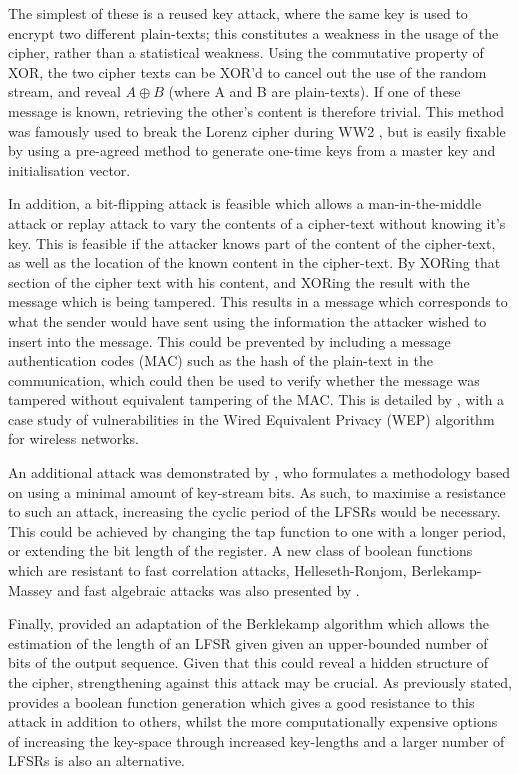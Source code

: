 \documentclass[british,10pt,a4paper]{article}
\begin{document}
The simplest of these is a reused key attack, where the same key is used to encrypt two different plain-texts; this constitutes a weakness in the usage of the cipher, rather than a statistical weakness. Using the commutative property of XOR, the two cipher texts can be XOR'd to cancel out the use of the random stream, and reveal \(A \oplus B\) (where A and B are plain-texts). If one of these message is known, retrieving the other's content is therefore trivial. This method was famously used to break the Lorenz cipher during WW2 \cite{sale}, but is easily fixable by using a pre-agreed method to generate one-time keys from a master key and initialisation vector. 

In addition, a bit-flipping attack is feasible which allows a man-in-the-middle attack or replay attack to vary the contents of a cipher-text without knowing it's key. This is feasible if the attacker knows part of the content of the cipher-text, as well as the location of the known content in the cipher-text. By XORing that section of the cipher text with his content, and XORing the result with the message which is being tampered. This results in a message which corresponds to what the sender would have sent using the information the attacker wished to insert into the message. This could be prevented by including a message authentication codes (MAC) such as the hash of the plain-text in the communication, which could then be used to verify whether the message was tampered without equivalent tampering of the MAC. This is detailed by \citet{Isaacs}, with a case study of vulnerabilities in the Wired Equivalent Privacy (WEP) algorithm for wireless networks.

An additional attack was demonstrated by \citet{helleseth}, who formulates a methodology based on using a minimal amount of key-stream bits. As such, to maximise a resistance to such an attack, increasing the cyclic period of the LFSRs would be necessary. This could be achieved by changing the tap function to one with a longer period, or extending the bit length of the register. A new class of boolean functions which are resistant to fast correlation attacks, Helleseth-Ronjom, Berlekamp-Massey and fast algebraic attacks was also presented by \citet{carlet2}.

Finally, \citet{massey} provided an adaptation of the Berklekamp algorithm which allows the estimation of the length of an LFSR given \citet{massey} given an upper-bounded number of bits of the output sequence. Given that this could reveal a hidden structure of the cipher, strengthening against this attack may be crucial. As previously stated, \citeauthor{carlet2} provides a boolean function generation which gives a good resistance to this attack in addition to others, whilst the more computationally expensive options of increasing the key-space through increased key-lengths and a larger number of LFSRs is also an alternative.
\end{document}
